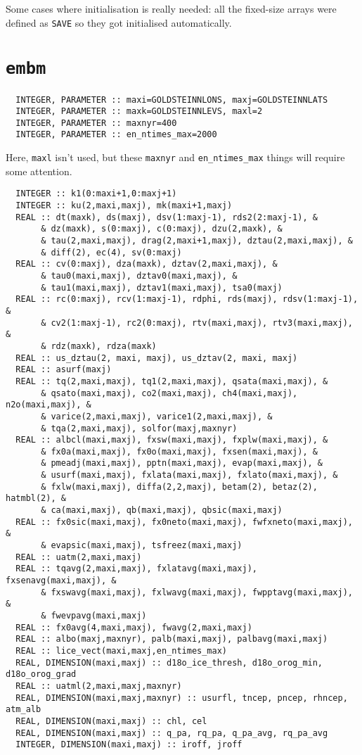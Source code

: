 \documentclass[a4paper,10pt,article]{memoir}
\begin{document}
Some cases where initialisation is really needed: all the fixed-size
arrays were defined as \texttt{SAVE} so they got initialised
automatically.

\section{\texttt{embm}}

\begin{verbatim}
  INTEGER, PARAMETER :: maxi=GOLDSTEINNLONS, maxj=GOLDSTEINNLATS
  INTEGER, PARAMETER :: maxk=GOLDSTEINNLEVS, maxl=2
  INTEGER, PARAMETER :: maxnyr=400
  INTEGER, PARAMETER :: en_ntimes_max=2000
\end{verbatim}

Here, \texttt{maxl} isn't used, but these \texttt{maxnyr} and
\texttt{en\_ntimes\_max} things will require some attention.

\begin{verbatim}
  INTEGER :: k1(0:maxi+1,0:maxj+1)
  INTEGER :: ku(2,maxi,maxj), mk(maxi+1,maxj)
  REAL :: dt(maxk), ds(maxj), dsv(1:maxj-1), rds2(2:maxj-1), &
       & dz(maxk), s(0:maxj), c(0:maxj), dzu(2,maxk), &
       & tau(2,maxi,maxj), drag(2,maxi+1,maxj), dztau(2,maxi,maxj), &
       & diff(2), ec(4), sv(0:maxj)
  REAL :: cv(0:maxj), dza(maxk), dztav(2,maxi,maxj), &
       & tau0(maxi,maxj), dztav0(maxi,maxj), &
       & tau1(maxi,maxj), dztav1(maxi,maxj), tsa0(maxj)
  REAL :: rc(0:maxj), rcv(1:maxj-1), rdphi, rds(maxj), rdsv(1:maxj-1), &
       & cv2(1:maxj-1), rc2(0:maxj), rtv(maxi,maxj), rtv3(maxi,maxj), &
       & rdz(maxk), rdza(maxk)
  REAL :: us_dztau(2, maxi, maxj), us_dztav(2, maxi, maxj)
  REAL :: asurf(maxj)
  REAL :: tq(2,maxi,maxj), tq1(2,maxi,maxj), qsata(maxi,maxj), &
       & qsato(maxi,maxj), co2(maxi,maxj), ch4(maxi,maxj), n2o(maxi,maxj), &
       & varice(2,maxi,maxj), varice1(2,maxi,maxj), &
       & tqa(2,maxi,maxj), solfor(maxj,maxnyr)
  REAL :: albcl(maxi,maxj), fxsw(maxi,maxj), fxplw(maxi,maxj), &
       & fx0a(maxi,maxj), fx0o(maxi,maxj), fxsen(maxi,maxj), &
       & pmeadj(maxi,maxj), pptn(maxi,maxj), evap(maxi,maxj), &
       & usurf(maxi,maxj), fxlata(maxi,maxj), fxlato(maxi,maxj), &
       & fxlw(maxi,maxj), diffa(2,2,maxj), betam(2), betaz(2), hatmbl(2), &
       & ca(maxi,maxj), qb(maxi,maxj), qbsic(maxi,maxj)
  REAL :: fx0sic(maxi,maxj), fx0neto(maxi,maxj), fwfxneto(maxi,maxj), &
       & evapsic(maxi,maxj), tsfreez(maxi,maxj)
  REAL :: uatm(2,maxi,maxj)
  REAL :: tqavg(2,maxi,maxj), fxlatavg(maxi,maxj), fxsenavg(maxi,maxj), &
       & fxswavg(maxi,maxj), fxlwavg(maxi,maxj), fwpptavg(maxi,maxj), &
       & fwevpavg(maxi,maxj)
  REAL :: fx0avg(4,maxi,maxj), fwavg(2,maxi,maxj)
  REAL :: albo(maxj,maxnyr), palb(maxi,maxj), palbavg(maxi,maxj)
  REAL :: lice_vect(maxi,maxj,en_ntimes_max)
  REAL, DIMENSION(maxi,maxj) :: d18o_ice_thresh, d18o_orog_min, d18o_orog_grad
  REAL :: uatml(2,maxi,maxj,maxnyr)
  REAL, DIMENSION(maxi,maxj,maxnyr) :: usurfl, tncep, pncep, rhncep, atm_alb
  REAL, DIMENSION(maxi,maxj) :: chl, cel
  REAL, DIMENSION(maxi,maxj) :: q_pa, rq_pa, q_pa_avg, rq_pa_avg
  INTEGER, DIMENSION(maxi,maxj) :: iroff, jroff
\end{verbatim}
\end{document}
